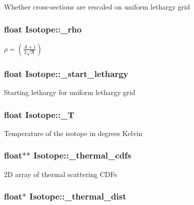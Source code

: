 Whether cross-\/sections are rescaled on uniform lethargy grid \hypertarget{classIsotope_a868ef4353a0481beb687a138b11646b2}{
\subsubsection[{\-\_\-rho}]{\setlength{\rightskip}{0pt plus 5cm}float Isotope\-::\-\_\-rho\hspace{0.3cm}{\ttfamily [private]}}}\label{classIsotope_a868ef4353a0481beb687a138b11646b2}
$ \rho = \left(\frac{A+1}{2\sqrt{A}}\right) $ \hypertarget{classIsotope_a96d70bb50adb0ae65f5134a895349a34}{
\subsubsection[{\-\_\-start\-\_\-lethargy}]{\setlength{\rightskip}{0pt plus 5cm}float Isotope\-::\-\_\-start\-\_\-lethargy\hspace{0.3cm}{\ttfamily [private]}}}\label{classIsotope_a96d70bb50adb0ae65f5134a895349a34}
Starting lethargy for uniform lethargy grid \hypertarget{classIsotope_a6f0664722f1697f821f39e9a2dac0523}{
\subsubsection[{\-\_\-\-T}]{\setlength{\rightskip}{0pt plus 5cm}float Isotope\-::\-\_\-\-T\hspace{0.3cm}{\ttfamily [private]}}}\label{classIsotope_a6f0664722f1697f821f39e9a2dac0523}
Temperature of the isotope in degrees Kelvin \hypertarget{classIsotope_a273dfb14475d3d16c5c8ed37dababfa5}{
\subsubsection[{\-\_\-thermal\-\_\-cdfs}]{\setlength{\rightskip}{0pt plus 5cm}float$\ast$$\ast$ Isotope\-::\-\_\-thermal\-\_\-cdfs\hspace{0.3cm}{\ttfamily [private]}}}\label{classIsotope_a273dfb14475d3d16c5c8ed37dababfa5}
2\-D array of thermal scattering C\-D\-Fs \hypertarget{classIsotope_a75f6f039420234ae8d2fd8ee54e5592d}{
\subsubsection[{\-\_\-thermal\-\_\-dist}]{\setlength{\rightskip}{0pt plus 5cm}float$\ast$ Isotope\-::\-\_\-thermal\-\_\-dist\hspace{0.3cm}{\ttfamily [private]}}}\label{classIsotope_a75f6f039420234ae8d2fd8ee54e5592d}

